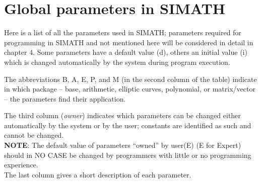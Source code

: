 \section{Global parameters in SIMATH}
Here is a list of all the parameters used in SIMATH; parameters required for
programming in SIMATH and not mentioned here will be considered in detail in chapter 4.
Some parameters have a default value (d), others an initial value (i) which is
changed automatically by the system during program execution.

The abbreviations B, A, E, P, and M (in the second column of the table) indicate
in which package -- base, arithmetic, elliptic curves, polynomial, or matrix/vector -- 
the parameters find their application.

The third column ({\em owner\/}) indicates which parameters can be changed either
auto\-ma\-tically by the system or by the user; constants are identified as such and cannot
be changed.\\
{\bf NOTE}: The default value of parameters ``owned'' by user(E) (E for Expert)
should in NO CASE be changed by programmers with little or no programming experience.\\
The last column gives a short description of each parameter.

